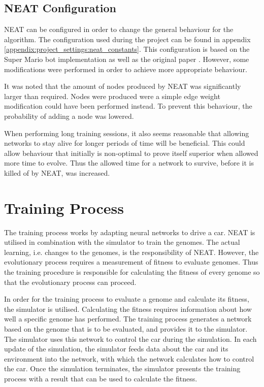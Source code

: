 \subsection{NEAT Configuration}
NEAT can be configured in order to change the general behaviour for the algorithm. The configuration used during the project can be found in appendix \ref{appendix:project_settings:neat_constants}. This configuration is based on the Super Mario bot implementation \cite{mario_source} as well as the original paper \cite{stanley:neat}. However, some modifications were performed in order to achieve more appropriate behaviour.

It was noted that the amount of nodes produced by NEAT was significantly larger than required. Nodes were produced were a simple edge weight modification could have been performed instead. To prevent this behaviour, the probability of adding a node was lowered.

When performing long training sessions, it also seems reasonable that allowing networks to stay alive for longer periods of time will be beneficial. This could allow behaviour that initially is non-optimal to prove itself superior when allowed more time to evolve. Thus the allowed time for a network to survive, before it is killed of by NEAT, was increased.



\section{Training Process}
The training process works by adapting neural networks to drive a car. NEAT is utilised in combination with the simulator to train the genomes. The actual learning, i.e. changes to the genomes, is the responsibility of NEAT. However, the evolutionary process requires a measurement of fitness to evaluate genomes. Thus the training procedure is responsible for calculating the fitness of every genome so that the evolutionary process can proceed. 

In order for the training process to evaluate a genome and calculate its fitness, the simulator is utilised. Calculating the fitness requires information about how well a specific genome has performed. The training process generates a network based on the genome that is to be evaluated, and provides it to the simulator. The simulator uses this network to control the car during the simulation. In each update of the simulation, the simulator feeds data about the car and its environment into the network, with which the network calculates how to control the car. Once the simulation terminates, the simulator presents the training process with a result that can be used to calculate the fitness.

